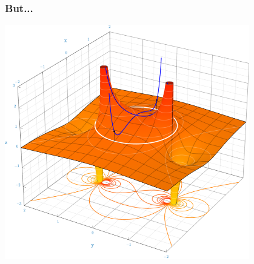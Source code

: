 \begin{frame}
\frametitle{But...}
\begin{center}
\includegraphics[width=0.8\textwidth]{TaylorComplexConv}
\end{center}
\end{frame}
